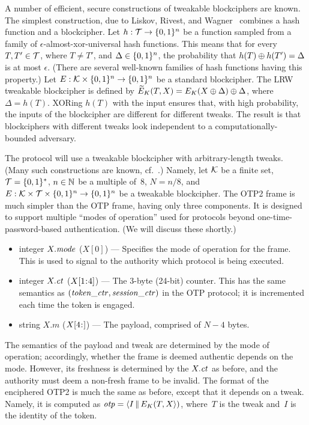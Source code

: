 A number of efficient, secure constructions of tweakable blockciphers are known.
The simplest construction, due to Liskov, Rivest, and
Wagner~\cite{liskov2011tweakable} combines a hash function and a blockcipher.
Let $h : \mathcal{T} \to \{0,1\}^n$ be a function sampled from a family of
$\epsilon$-almost-xor-universal hash functions. This means that for every
$T,T'\in\mathcal{T}$, where $T\ne T'$, and $\Delta\in\{0,1\}^n$, the probability that $h(T)\mathbin{\oplus} h(T') =
\Delta$ is at most $\epsilon$.
%
(There are several well-known families of hash functions having this property.)
Let $E:\mathcal{K}\times\{0,1\}^n\to\{0,1\}^n$ be a standard blockcipher.  The LRW
tweakable blockcipher is defined by $\widetilde{E}_K(T,X) = E_K(X \mathbin{\oplus} \Delta)
\mathbin{\oplus} \Delta$, where $\Delta = h(T)$.
%
XORing $h(T)$ with the input ensures that, with high probability, the inputs of
the blockcipher are different for different tweaks. The result is that
blockciphers with different tweaks look independent to a computationally-bounded
adversary.

The protocol will use a tweakable blockcipher with arbitrary-length tweaks.
(Many such constructions are known, cf.~\cite{liskov2011tweakable,landescher2012tweak}.)
%
Namely, let $\mathcal{K}$ be a finite set, $\mathcal{T}=\{0,1\}^*$, $n\in\mathbb{N}$ be a multiple
of~$8$, $N=n/8$, and $E:\mathcal{K}\times\mathcal{T}\times\{0,1\}^n\to\{0,1\}^n$ be a tweakable
blockcipher. The OTP2 frame is much simpler than the OTP frame, having only
three components. It is designed to support multiple ``modes of operation'' used
for protocols beyond one-time-password-based authentication. (We will
discuss these shortly.)
\begin{itemize}
  \item integer $X.\mathit{mode}$ ($X[0]$) --- Specifies the mode of operation for the
    frame. This is used to signal to the authority which protocol is being
    executed.
  \item integer $X.\mathit{ct}$ ($\substr(X,1,4)$) --- The 3-byte (24-bit) counter. This
    has the same semantics as $(\mathit{token\_ctr},\mathit{session\_ctr})$ in the OTP protocol; it is
    incremented each time the token is engaged.
  \item string $X.m$ ($\substr(X,4,)$) --- The payload, comprised of $N-4$
    bytes.
\end{itemize}
The semantics of the payload and tweak are determined by the mode of operation; accordingly,
whether the frame is deemed authentic depends on the mode. However, its freshness is
determined by the $X.\mathit{ct}$ as before, and the authority must deem a non-fresh
frame to be invalid.
%
The format of the enciphered OTP2 is much the same as before, except that it
depends on a tweak. Namely, it is computed as $\otp = \str(I \cat E_K(T,X))$,
where~$T$ is the tweak and~$I$ is the identity of the token.

